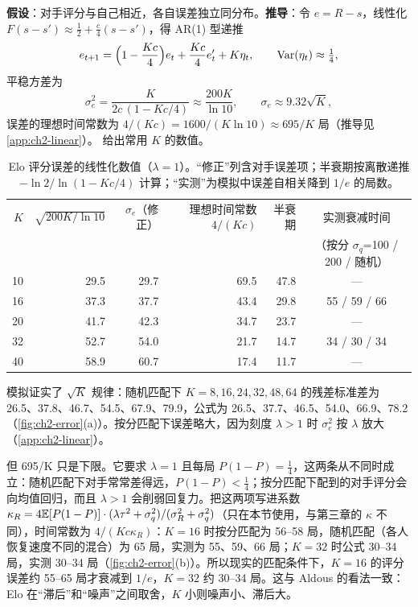 \textbf{假设}：对手评分与自己相近，各自误差独立同分布。\textbf{推导}：令 $e=R-s$，线性化 $F(s-s')\approx\tfrac12+\tfrac c4(s-s')$，得 AR(1) 型递推
\begin{equation}
  e_{t+1}=\Bigl(1-\frac{Kc}4\Bigr)e_t+\frac{Kc}4e'_t+K\eta_t,\qquad \operatorname{Var}(\eta_t)\approx\tfrac14,
\end{equation}
平稳方差为
\begin{equation}
  \sigma_e^2=\frac{K}{2c\,(1-Kc/4)}\approx\frac{200K}{\ln10},\qquad \sigma_e\approx9.32\sqrt K,
  \label{eq:ch2-sigmae}
\end{equation}
误差的理想时间常数为 $4/(Kc)=1600/(K\ln10)\approx695/K$ 局（推导见\cref{app:ch2-linear}）。 给出常用 $K$ 的数值。

\begin{table}[htbp]
  \centering\small
  \caption{Elo 评分误差的线性化数值（$\lambda=1$）。“修正”列含对手误差项；半衰期按离散递推 $-\ln2/\ln(1-Kc/4)$ 计算；“实测”为模拟中误差自相关降到 $1/e$ 的局数。\tagOwn}
  \label{tab:ch2-sigmae}
  \setlength{\tabcolsep}{4.5pt}
  \begin{tabular}{rrrrrc}
    \toprule
    $K$ & $\sqrt{200K/\ln10}$ & $\sigma_e$（修正） & 理想时间常数 $4/(Kc)$ & 半衰期 & 实测衰减时间\\
    &&&&& （按分 $\sigma_q$=100 / 200 / 随机）\\
    \midrule
    10 & 29.5 & 29.7 & 69.5 & 47.8 & —\\
    16 & 37.3 & 37.7 & 43.4 & 29.8 & 55 / 59 / 66\\
    20 & 41.7 & 42.3 & 34.7 & 23.7 & —\\
    32 & 52.7 & 54.0 & 21.7 & 14.7 & 34 / 30 / 34\\
    40 & 58.9 & 60.7 & 17.4 & 11.7 & —\\
    \bottomrule
  \end{tabular}
\end{table}

模拟证实了 $\sqrt K$ 规律：随机匹配下 $K=8,16,24,32,48,64$ 的残差标准差为 26.5、37.8、46.7、54.5、67.9、79.9，公式为 26.5、37.7、46.5、54.0、66.9、78.2（\cref{fig:ch2-error}(a)）\tagOwn。按分匹配下误差略大，因为刻度 $\lambda>1$ 时 $\sigma_e^2$ 按 $\lambda$ 放大（\cref{app:ch2-linear}）。

但 695/K 只是下限。它要求 $\lambda=1$ 且每局 $P(1-P)=\tfrac14$，这两条从不同时成立：随机匹配下对手常常差得远，$P(1-P)<\tfrac14$；按分匹配下配到的对手评分会向均值回归，而且 $\lambda>1$ 会削弱回复力。把这两项写进系数 $\kappa_R=4\mathbb{E}[P(1-P)]\cdot(\lambda\tau^2+\sigma_q^2)/(\sigma_R^2+\sigma_q^2)$（只在本节使用，与第三章的 $\kappa$ 不同），时间常数为 $4/(Kc\kappa_R)$：$K=16$ 时按分匹配为 56–58 局，随机匹配（各人恢复速度不同的混合）为 65 局，实测为 55、59、66 局；$K=32$ 时公式 30–34 局，实测 30–34 局（\cref{fig:ch2-error}(b)）\tagOwn。所以现实的匹配条件下，$K=16$ 的评分误差约 55–65 局才衰减到 $1/e$，$K=32$ 约 30–34 局。这与 Aldous 的看法一致：Elo 在“滞后”和“噪声”之间取舍，$K$ 小则噪声小、滞后大\cite{aldous2017elo}\tagLit。


